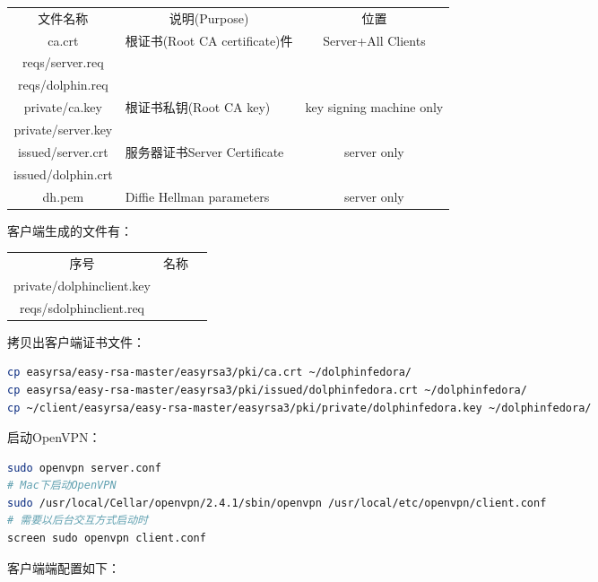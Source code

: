 \documentclass[11pt,fleqn]{book}
\numberwithin{dummy}{section}
\theoremstyle{ocrenumbox}
\theoremstyle{blacknumex}
\theoremstyle{blacknumbox}
\theoremstyle{ocrenum}
\begin{document}
\begin{tabular}{|c|p{5cm}|c|}
	\hline
	\multirow{1}{*}{文件名称}
	& \multicolumn{1}{c|}{说明(Purpose)} 
	& \multicolumn{1}{c|}{位置} \\			
	\cline{1-3}
	ca.crt  & 根证书(Root CA certificate)件 & Server+All Clients	\\
	\hline
	reqs/server.req  & &\\
	\hline
	reqs/dolphin.req  & &\\
	\hline
	private/ca.key & 根证书私钥(Root CA key) & key signing machine only\\
	\hline
	private/server.key && \\
	\hline
	issued/server.crt & 服务器证书Server Certificate & server only\\
	\hline
	issued/dolphin.crt && \\
	\hline
	dh.pem & Diffie Hellman parameters & server only \\
	\hline
\end{tabular}

客户端生成的文件有：

\begin{tabular}{|c|p{8cm}|c|}
	\hline
	\multirow{1}{*}{序号}
	& \multicolumn{1}{c|}{名称}  \\			
	\cline{1-2}
	private/dolphinclient.key  & \\
	\hline
	reqs/sdolphinclient.req & \\
	\hline
\end{tabular}

拷贝出客户端证书文件：

\begin{lstlisting}[language=Bash]
cp easyrsa/easy-rsa-master/easyrsa3/pki/ca.crt ~/dolphinfedora/
cp easyrsa/easy-rsa-master/easyrsa3/pki/issued/dolphinfedora.crt ~/dolphinfedora/
cp ~/client/easyrsa/easy-rsa-master/easyrsa3/pki/private/dolphinfedora.key ~/dolphinfedora/
\end{lstlisting}


启动OpenVPN：

\begin{lstlisting}[language=Bash]
sudo openvpn server.conf
# Mac下启动OpenVPN
sudo /usr/local/Cellar/openvpn/2.4.1/sbin/openvpn /usr/local/etc/openvpn/client.conf
# 需要以后台交互方式启动时
screen sudo openvpn client.conf
\end{lstlisting}

客户端端配置如下：
\end{document}
